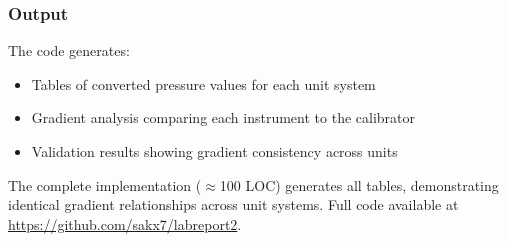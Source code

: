 \documentclass{article}
\begin{document}
\subsubsection{Output}
The code generates:
\begin{itemize}
	\item Tables of converted pressure values for each unit system
	\item Gradient analysis comparing each instrument to the calibrator
	\item Validation results showing gradient consistency across units
\end{itemize}

\vspace{1em}
The complete implementation ($\approx$100 LOC) generates all tables, demonstrating identical gradient relationships across unit systems. Full code available at \url{https://github.com/sakx7/labreport2}.
\end{document}
